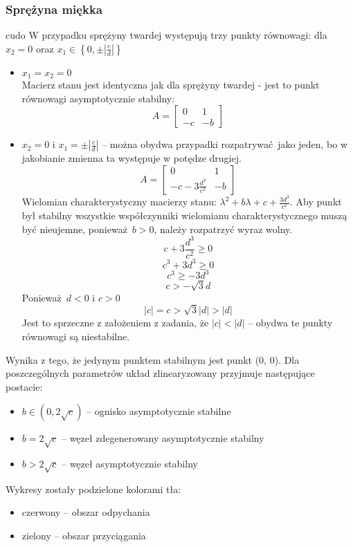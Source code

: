 \documentclass[a4paper, 10pt]{article}
\begin{document}
			\subsubsection{Sprężyna miękka}
				cudo
				W przypadku sprężyny twardej występują trzy punkty równowagi: dla $x_2 = 0$ oraz $x_1 \in \left\{0, \pm \left| \frac{c}{d}\right|\right\}$
				\begin{itemize}
					\item[] $x_1 = x_2 = 0$ \\
						Macierz stanu jest identyczna jak dla sprężyny twardej - jest to punkt równowagi asymptotycznie stabilny:
						$$
							A = \begin{bmatrix}
								0 & 1 \\
								-c  & -b
							\end{bmatrix}
						$$
					\item[] $x_2 = 0$ i $x_1 = \pm \left| \frac{c}{d}\right|$ -- można obydwa przypadki rozpatrywać jako jeden, bo w jakobianie zmienna ta występuje w potędze drugiej.
						$$
							A = \begin{bmatrix}
								0 & 1 \\
								-c - 3\frac{d^3}{c^2} & -b
							\end{bmatrix}
						$$
					Wielomian charakterystyczny macierzy stanu: $\lambda^2 + b\lambda + c + \frac{3 d^3}{c^2}$. Aby punkt był stabilny wszystkie współczynniki wielomianu charakterystycznego muszą być nieujemne, ponieważ $b>0$, należy rozpatrzyć wyraz wolny.
					$$
						 c + 3\frac{d^3}{c^2} \geq 0
					$$
					$$
						c^3 + 3d^3 \geq 0
					$$
					$$
						c^3 \geq -3d^3
					$$
					$$
						c > -\sqrt{3}d
					$$
					Ponieważ $d < 0$ i $c > 0$
					$$
						|c| = c > \sqrt{3} |d| > |d|
					$$
					Jest to sprzeczne z założeniem z zadania, że $|c| < |d|$ -- obydwa te punkty równowagi są niestabilne.
				\end{itemize}
				Wynika z tego, że jedynym punktem stabilnym jest punkt (0, 0). Dla poszczególnych parametrów układ zlinearyzowany przyjmuje następujące postacie:
				\begin{itemize}
					\item[] $b \in (0, 2\sqrt{c}) $ -- ognisko asymptotycznie stabilne
					\item[] $b = 2 \sqrt{c}$ -- węzeł zdegenerowany asymptotycznie stabilny
					\item[]	$b > 2\sqrt{c}$ -- węzeł asymptotycznie stabilny
				\end{itemize}
				Wykresy zostały podzielone kolorami tła:
				\begin{itemize}
					\item[] czerwony -- obszar odpychania
					\item[] zielony -- obszar przyciągania
				\end{itemize}
\end{document}
